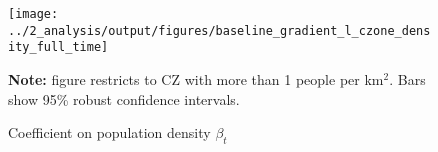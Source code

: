 \begin{figure}[!h]
\centering
\caption{Coefficient on population density $ \beta_t $}
\texttt{[image: ../2\_analysis/output/figures/baseline\_gradient\_l\_czone\_density\_full\_time]}
\par \begin{minipage}[h]{\textwidth}{\scriptsize\textbf{Note:} figure restricts to CZ with more than 1 people per km$^2$. Bars show 95\% robust confidence intervals.}\end{minipage}
\end{figure}
